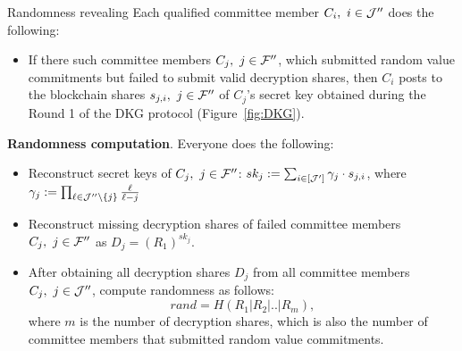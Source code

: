 \begin{boxfig}{\label{fig:rand_reveal}Randomness revealing}{}
Each qualified committee member $C_i,\ i \in \mathcal{J}''$ does the following:
\begin{itemize}
    \item If there such committee members $C_j,\ j \in \FFF''$, which submitted random value commitments but failed to submit valid decryption shares, then $C_i$ posts to the blockchain shares $s_{j,i},\ j \in \mathcal{F}''$ of $C_j$'s secret key obtained during the Round 1 of the DKG protocol (Figure~\ref{fig:DKG}).\\
\end{itemize}

\textbf{Randomness computation}. Everyone does the following:
\begin{itemize}
	\item Reconstruct secret keys of $C_j,\ j\in\FFF''$: $sk_j := \sum_{i\in[\mathcal{J}']} \gamma_{j} \cdot s_{j,i}$, where $\gamma_{j}:= \prod_{\ell\in \mathcal{J}''\setminus \{j\} } \frac{\ell}{\ell-j}$
	\item Reconstruct missing decryption shares of failed committee members $C_j,\ j\in\FFF''$ as $D_{j}=(R_{1})^{sk_j}$.
	\item After obtaining all decryption shares $D_{j}$ from all committee members $C_j,\ j\in\JJJ''$, compute randomness as follows: \[rand=H(R_1 | R_2 | .. | R_m),\] where $m$ is the number of decryption shares, which is also the number of committee members that submitted random value commitments.
\end{itemize}
\end{boxfig}